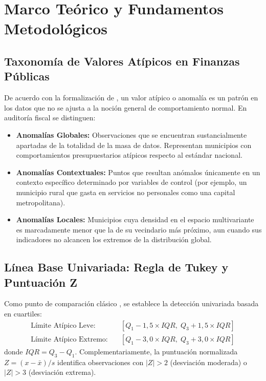 \documentclass[11pt,a4paper]{article}
\begin{document}
\section{Marco Teórico y Fundamentos Metodológicos}

\subsection{Taxonomía de Valores Atípicos en Finanzas Públicas}
De acuerdo con la formalización de \citet{chandola2009anomaly}, un valor atípico o anomalía es un patrón en los datos que no se ajusta a la noción general de comportamiento normal. En auditoría fiscal se distinguen:
\begin{itemize}[noitemsep]
    \item \textbf{Anomalías Globales:} Observaciones que se encuentran sustancialmente apartadas de la totalidad de la masa de datos. Representan municipios con comportamientos presupuestarios atípicos respecto al estándar nacional.
    \item \textbf{Anomalías Contextuales:} Puntos que resultan anómalos únicamente en un contexto específico determinado por variables de control (por ejemplo, un municipio rural que gasta en servicios no personales como una capital metropolitana).
    \item \textbf{Anomalías Locales:} Municipios cuya densidad en el espacio multivariante es marcadamente menor que la de su vecindario más próximo, aun cuando sus indicadores no alcancen los extremos de la distribución global.
\end{itemize}

\subsection{Línea Base Univariada: Regla de Tukey y Puntuación Z}
Como punto de comparación clásico \citep{tukey1977eda}, se establece la detección univariada basada en cuartiles:
\begin{align}
    \text{Límite Atípico Leve:} & \quad [Q_1 - 1,5 \times IQR, \; Q_3 + 1,5 \times IQR] \\
    \text{Límite Atípico Extremo:} & \quad [Q_1 - 3,0 \times IQR, \; Q_3 + 3,0 \times IQR]
\end{align}
donde $IQR = Q_3 - Q_1$. Complementariamente, la puntuación normalizada $Z = (x - \bar{x})/s$ identifica observaciones con $|Z| > 2$ (desviación moderada) o $|Z| > 3$ (desviación extrema).
\end{document}
